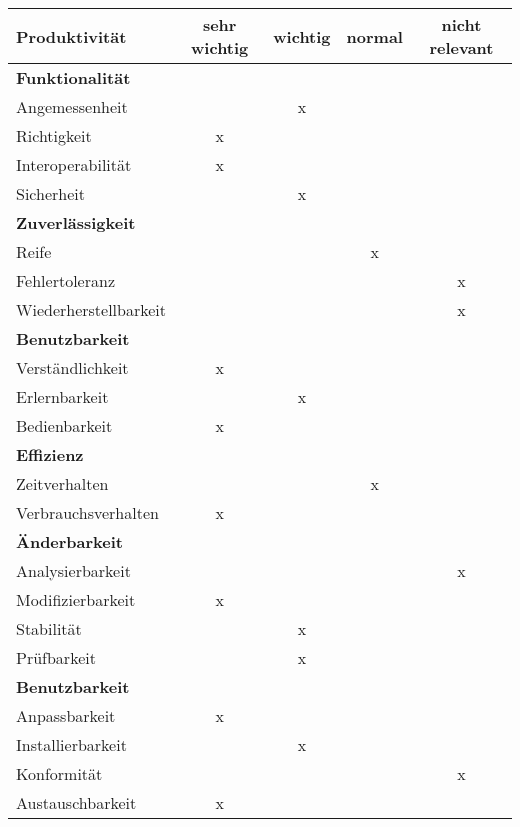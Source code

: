 \documentclass[parskip=full,11pt]{scrartcl}
\begin{document}
\renewcommand{\arraystretch}{1.5}
\begin{table}[H]
  \begin{center}
    \begin{tabularx}{\textwidth}{X c c c c}
      \hline
      
      \textbf{{\large Produktivität}} & \textbf{{\large sehr wichtig}} & \textbf{{\large wichtig}} & \textbf{{\large normal} } &\textbf{{\large nicht relevant }}\\
      
      \hline      
      \multicolumn{5}{l}{\textbf{Funktionalität}}\\      
      \hline      
      Angemessenheit &   & x &   &  \\
	  Richtigkeit & x &   &   &  \\
	  Interoperabilität & x &   &   &  \\
      Sicherheit &   & x &   &  \\	
		    
	  \hline	  
      \multicolumn{5}{l}{\textbf{Zuverlässigkeit}}\\     
      \hline
      Reife &   &   & x &  \\
	  Fehlertoleranz &   &   &   & x\\
	  Wiederherstellbarkeit &   &   &   & x\\
		
	  \hline	  	
	  \multicolumn{5}{l}{\textbf{Benutzbarkeit}}\\
      \hline
      Verständlichkeit & x &   &   &  \\
	  Erlernbarkeit &   & x &   &  \\
	  Bedienbarkeit & x &   &   &  \\
	  
	  \hline	  	
	  \multicolumn{5}{l}{\textbf{Effizienz}}\\
      \hline
      Zeitverhalten &   &   & x &  \\
	  Verbrauchsverhalten & x &   &   &  \\	
	  
	  \hline	  	
	  \multicolumn{5}{l}{\textbf{Änderbarkeit}}\\
      \hline
      Analysierbarkeit &   &   &   & x\\
	  Modifizierbarkeit & x &   &   &  \\
	  Stabilität &   & x &   &  \\
	  Prüfbarkeit &  & x &  & \\

	  
	  \hline	  	
	  \multicolumn{5}{l}{\textbf{Benutzbarkeit}}\\
      \hline
      Anpassbarkeit & x &  &  & \\
	  Installierbarkeit &  & x &  & \\
	  Konformität &  &  &  & x\\
	  Austauschbarkeit & x &  &  & \\
	  
	  \hline      			
    \end{tabularx}
  \end{center}
  
\end{table}
\renewcommand{\arraystretch}{1}
\end{document}
